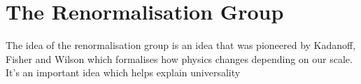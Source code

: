 \section{The Renormalisation Group}%
\label{sec:the_renormalisation_group}
The idea of the renormalisation group is an idea that 
was pioneered by Kadanoff, Fisher and Wilson which formalises
how physics changes depending on our scale. It's an important idea 
which helps explain universality


